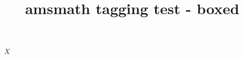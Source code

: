 \documentclass{article}
\title{amsmath tagging test - boxed}
\begin{document}
$\boxed{X}$
\end{document}
